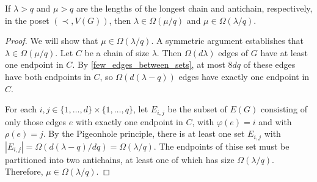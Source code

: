 \documentclass{patmorin}
\begin{document}
%
%
%
%
%
%

\begin{lem}\label{chain_antichain}
  If $\lambda>q$ and $\mu>q$ are the lengths of the longest chain and antichain, respectively, in the poset $(\prec,V(G))$, then  $\lambda \in \Omega(\mu/q)$ and $\mu\in\Omega(\lambda/q)$.
\end{lem}

\begin{proof}
  We will show that $\mu\in\Omega(\lambda/q)$. A symmetric argument establishes that $\lambda\in\Omega(\mu/q)$.  Let $C$ be a chain of size $\lambda$.  Then $\Omega(d\lambda)$ edges of $G$ have at least one endpoint in $C$.  By \cref{few_edges_between_sets}, at most $8dq$ of these edges have both endpoints in $C$, so $\Omega(d(\lambda-q))$ edges have exactly one endpoint in $C$.

  For each $i,j\in\{1,\ldots,d\}\times\{1,\ldots,q\}$, let $E_{i,j}$ be the subset of $E(G)$ consisting of only those edges $e$ with exactly one endpoint in $C$, with $\varphi(e)=i$ and with $\rho(e)=j$.  By the Pigeonhole principle, there is at least one set $E_{i,j}$ with $|E_{i,j}|=\Omega(d(\lambda-q)/dq) = \Omega(\lambda/q)$.  The endpoints of thise set must be partitioned into two antichains, at least one of which has size $\Omega(\lambda/q)$.  Therefore, $\mu\in\Omega(\lambda/q)$.
\end{proof}
\end{document}
